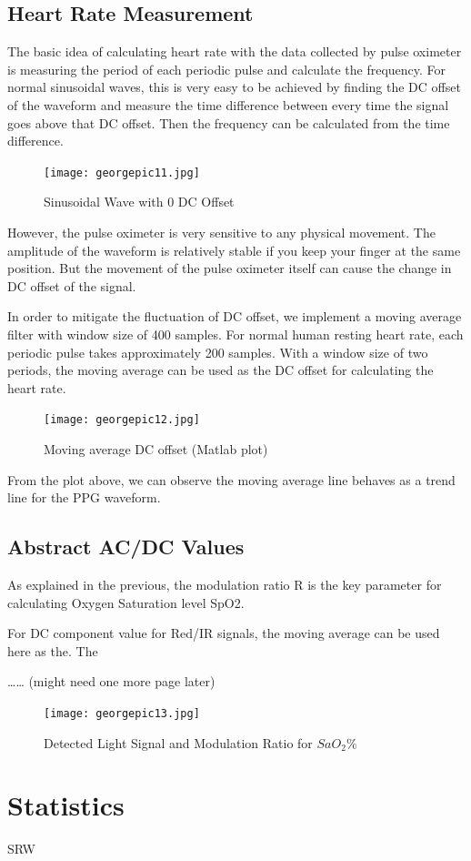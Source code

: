 \subsection{Heart Rate Measurement}

The basic idea of calculating heart rate with the data collected by pulse oximeter is measuring the period of each periodic pulse and calculate the frequency. For normal sinusoidal waves, this is very easy to be achieved by finding the DC offset of the waveform and measure the time difference between every time the signal goes above that DC offset. Then the frequency can be calculated from the time difference.

\begin{figure}[H]
	\centering
	\texttt{[image: georgepic11.jpg]}
	\caption{Sinusoidal Wave with 0 DC Offset}
\end{figure}

However, the pulse oximeter is very sensitive to any physical movement. The amplitude of the waveform is relatively stable if you keep your finger at the same position. But the movement of the pulse oximeter itself can cause the change in DC offset of the signal.

In order to mitigate the fluctuation of DC offset, we implement a moving average filter with window size of 400 samples. For normal human resting heart rate, each periodic pulse takes approximately 200 samples. With a window size of two periods, the moving average can be used as the DC offset for calculating the heart rate.

\begin{figure}[H]
	\centering
	\texttt{[image: georgepic12.jpg]}
	\caption{Moving average DC offset (Matlab plot)}
\end{figure}

From the plot above, we can observe the moving average line behaves as a trend line for the PPG waveform.

\subsection{Abstract AC/DC Values}

As explained in the previous, the modulation ratio R is the key parameter for calculating Oxygen Saturation level SpO2. 

For DC component value for Red/IR signals, the moving average can be used here as the. 
The 

…… (might need one more page later)

\begin{figure}[H]
	\centering
	\texttt{[image: georgepic13.jpg]}
	\caption{Detected Light Signal and Modulation Ratio for $SaO_2\%$}
\end{figure}


\section{Statistics}

SRW